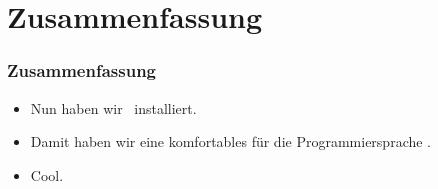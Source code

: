 \documentclass[aspectratio=169,mathserif,notheorems]{beamer}%
\begin{document}
\section{Zusammenfassung}%
%
\begin{frame}\frametitle{Zusammenfassung}%
\begin{itemize}%
\item Nun haben wir \pycharm\ installiert.%
\item<2-> Damit haben wir eine komfortables  für die Programmiersprache \python.%
\item<3-> Cool.%
\end{itemize}%
\end{frame}%
%
\endPresentation%
\end{document}
